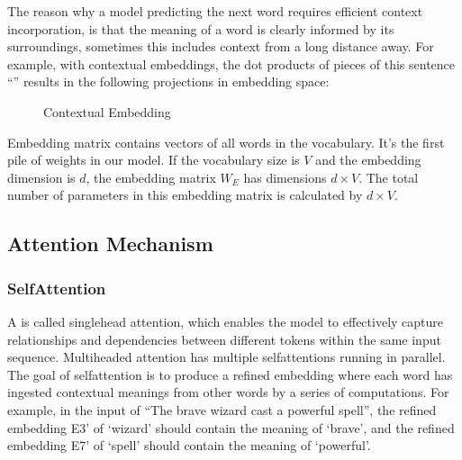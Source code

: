 \documentclass[letterpaper,11pt,english]{sphinxmanual}
\begin{document}
\sphinxAtStartPar
The reason why a model predicting the next word requires efficient
context incorporation, is that the meaning of a word is clearly informed
by its surroundings, sometimes this includes context from a long
distance away. For example, with contextual embeddings, the dot products
of pieces of this sentence “” results in the
following projections in embedding space:

\begin{figure}[htbp]
\centering
\capstart

\noindent{}
\caption{Contextual Embedding}\label{\detokenize{pretraining:id7}}\end{figure}

\sphinxAtStartPar
Embedding matrix contains vectors of all words in the vocabulary. It’s
the first pile of weights in our model. If the vocabulary size is
\(V\) and the embedding dimension is \(d\), the embedding matrix
\(W_E\) has dimensions \(d \times V\). The total number of
parameters in this embedding matrix is calculated by \(d \times V\).


\subsection{Attention Mechanism}
\label{\detokenize{pretraining:attention-mechanism}}

\subsubsection{Self\sphinxhyphen{}Attention}
\label{\detokenize{pretraining:self-attention}}
\sphinxAtStartPar
A  is called single\sphinxhyphen{}head attention, which enables the
model to effectively capture relationships and dependencies between
different tokens within the same input sequence. Multi\sphinxhyphen{}headed attention
has multiple self\sphinxhyphen{}attentions running in parallel. The goal of
self\sphinxhyphen{}attention is to produce a refined embedding where each word has
ingested contextual meanings from other words by a series of
computations. For example, in the input of “The brave wizard cast a
powerful spell”, the refined embedding E3’ of ‘wizard’ should contain
the meaning of ‘brave’, and the refined embedding E7’ of ‘spell’ should
contain the meaning of ‘powerful’.
\end{document}
